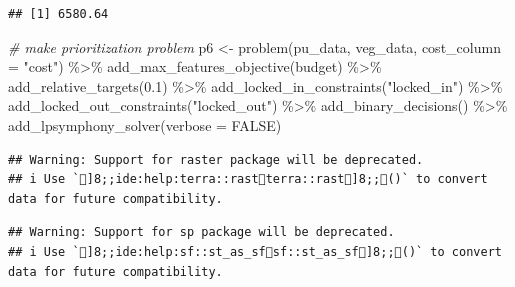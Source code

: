 \documentclass[
  12pt,
]{book}
\newenvironment{Shaded}{\begin{snugshade}}{\end{snugshade}}
\newcommand{\AttributeTok}[1]{\textcolor[rgb]{0.77,0.63,0.00}{#1}}
\newcommand{\CommentTok}[1]{\textcolor[rgb]{0.56,0.35,0.01}{\textit{#1}}}
\newcommand{\ConstantTok}[1]{\textcolor[rgb]{0.00,0.00,0.00}{#1}}
\newcommand{\DecValTok}[1]{\textcolor[rgb]{0.00,0.00,0.81}{#1}}
\newcommand{\FloatTok}[1]{\textcolor[rgb]{0.00,0.00,0.81}{#1}}
\newcommand{\FunctionTok}[1]{\textcolor[rgb]{0.00,0.00,0.00}{#1}}
\newcommand{\NormalTok}[1]{#1}
\newcommand{\OtherTok}[1]{\textcolor[rgb]{0.56,0.35,0.01}{#1}}
\newcommand{\SpecialCharTok}[1]{\textcolor[rgb]{0.00,0.00,0.00}{#1}}
\newcommand{\StringTok}[1]{\textcolor[rgb]{0.31,0.60,0.02}{#1}}
\begin{document}
\begin{Shaded}
\end{Shaded}

\begin{verbatim}
## [1] 6580.64
\end{verbatim}

\begin{Shaded}
\begin{Highlighting}[]
\CommentTok{\# make prioritization problem}
\NormalTok{p6 }\OtherTok{\textless{}{-}} \FunctionTok{problem}\NormalTok{(pu\_data, veg\_data, }\AttributeTok{cost\_column =} \StringTok{"cost"}\NormalTok{) }\SpecialCharTok{\%\textgreater{}\%}
      \FunctionTok{add\_max\_features\_objective}\NormalTok{(budget) }\SpecialCharTok{\%\textgreater{}\%}
      \FunctionTok{add\_relative\_targets}\NormalTok{(}\FloatTok{0.1}\NormalTok{) }\SpecialCharTok{\%\textgreater{}\%}
      \FunctionTok{add\_locked\_in\_constraints}\NormalTok{(}\StringTok{"locked\_in"}\NormalTok{) }\SpecialCharTok{\%\textgreater{}\%}
      \FunctionTok{add\_locked\_out\_constraints}\NormalTok{(}\StringTok{"locked\_out"}\NormalTok{) }\SpecialCharTok{\%\textgreater{}\%}
      \FunctionTok{add\_binary\_decisions}\NormalTok{() }\SpecialCharTok{\%\textgreater{}\%}
      \FunctionTok{add\_lpsymphony\_solver}\NormalTok{(}\AttributeTok{verbose =} \ConstantTok{FALSE}\NormalTok{)}
\end{Highlighting}
\end{Shaded}

\begin{verbatim}
## Warning: Support for raster package will be deprecated.
## i Use `]8;;ide:help:terra::rastterra::rast]8;;()` to convert data for future compatibility.
\end{verbatim}

\begin{verbatim}
## Warning: Support for sp package will be deprecated.
## i Use `]8;;ide:help:sf::st_as_sfsf::st_as_sf]8;;()` to convert data for future compatibility.
\end{verbatim}
\end{document}
